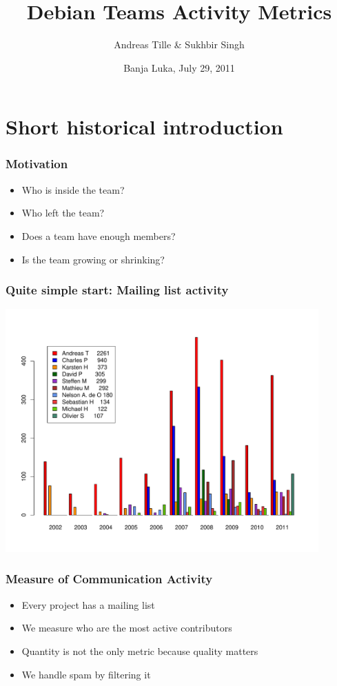 \documentclass[compress]{beamer}
\title{Debian Teams Activity Metrics}
\author{Andreas Tille \& Sukhbir Singh}
\institute{\link{http://www.debconf.org/debconf11/}{DebConf 11}}
\date{Banja Luka, July 29, 2011}
\begin{document}
\begin{frame}
  \titlepage
\end{frame}

\section{Short historical introduction}

\begin{frame}
  \frametitle{Motivation}

  \begin{itemize}
     \item Who is inside the team?
     \item Who left the team?
     \item Does a team have enough members?
     \item Is the team growing or shrinking?
  \end{itemize}
\end{frame}

\begin{frame}
  \frametitle{Quite simple start: Mailing list activity}
      \begin{center}
        \includegraphics[width=0.9\textwidth]{authorstat_med}
      \end{center}

\end{frame}

\begin{frame}
  \frametitle{Measure of Communication Activity}

  \begin{itemize}
     \item Every project has a mailing list
     \item We measure who are the most active contributors
     \item Quantity is not the only metric because quality matters 
     \item We handle spam by filtering it
  \end{itemize}

\end{frame}
\end{document}
